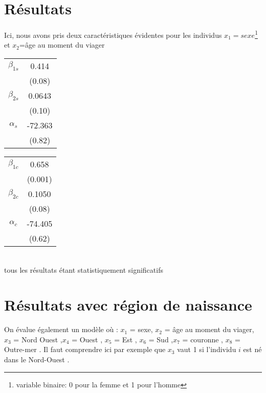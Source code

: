 \documentclass{article}
\begin{document}
\section{Résultats}
Ici, nous avons pris deux caractéristiques évidentes pour les individus $x_1=sexe$\footnote{variable binaire: 0 pour la femme et 1 pour l'homme} et $x_2$=âge au moment du viager\\


\begin{tabular}{c|c||}


            
$\beta_{1s}$ & 0.414   \\
            &(0.08)    \\
$\beta_{2s} $& 0.0643  \\
            &(0.10)  \\
$\alpha_s $& -72.363  \\
        &(0.82)    \\
        \end{tabular}
        \begin{tabular}{c|c|}
$\beta_{1c}$ & 0.658 \\
            &(0.001)  \\
$\beta_{2c}$ & 0.1050  \\
            &(0.08) \\
$\alpha_c$ & -74.405 \\
        &(0.62)  \\
\end{tabular}\\

tous les résultats étant statistiquement significatifs


\section{Résultats avec région de naissance}

On évalue également un modèle où : $x_{1}$ = sexe, $x_{2}$ = âge au moment du viager, $x_{3}$ = Nord Ouest ,$x_{4}$ = Ouest , $x_{5}$ = Est , $x_{6}$ = Sud ,$x_{7}$ = couronne , $x_{8}$ = Outre-mer .
Il faut comprendre ici par exemple que $x_{3}$ vaut 1 si l'individu $i$ est né dans le Nord-Ouest .\\
\end{document}
